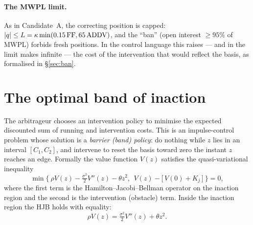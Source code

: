 \documentclass[11pt,a4paper]{article}
\DeclarePairedDelimiter{\abs}{\lvert}{\rvert}
\theoremstyle{plain}
\theoremstyle{definition}
\theoremstyle{remark}
\begin{document}
\paragraph{The MWPL limit.} As in Candidate~A, the correcting position is capped: $\abs{q}\le L=\kappa\min(0.15\,\mathrm{FF},65\,\mathrm{ADDV})$, and the ``ban'' (open interest $\ge 95\%$ of MWPL) forbids fresh positions. In the control language this raises --- and in the limit makes infinite --- the cost of the intervention that would reflect the basis, as formalised in \S\ref{sec:ban}.

\section{The optimal band of inaction}\label{sec:band}
The arbitrageur chooses an intervention policy to minimise the expected discounted sum of running and intervention costs. This is an impulse-control problem whose solution is a \emph{barrier (band) policy}: do nothing while $z$ lies in an interval $[C_1,C_2]$, and intervene to reset the basis toward zero the instant $z$ reaches an edge. Formally the value function $V(z)$ satisfies the quasi-variational inequality
\begin{equation}
\min\Big\{\ \rho V(z) - \tfrac{\sigma^2}{2}V''(z) - \theta z^2,\ \ V(z) - \big[\,V(0)+K_j\,\big]\ \Big\} = 0, \label{eq:qvi}
\end{equation}
where the first term is the Hamilton--Jacobi--Bellman operator on the inaction region and the second is the intervention (obstacle) term. Inside the inaction region the HJB holds with equality:
\begin{equation}
\rho V(z) = \tfrac{\sigma^2}{2}V''(z) + \theta z^2. \label{eq:hjb}
\end{equation}
\end{document}
